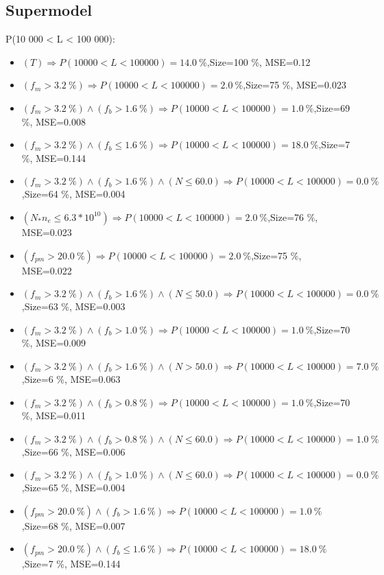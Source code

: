 \documentclass[numbered]{CSL}
\begin{document}
\subsection{Supermodel}
P(10 000 < L < 100 000):
\begin{itemize}
\item $(T) \Rightarrow P(10 000 < L < 100 000) = 14.0~\%$,\hfill Size=100 \%, MSE=0.12
\item $(f_m > 3.2~\%) \Rightarrow P(10 000 < L < 100 000) = 2.0~\%$,\hfill Size=75 \%, MSE=0.023
\item $(f_m > 3.2~\%) \land (f_b > 1.6~\%) \Rightarrow P(10 000 < L < 100 000) = 1.0~\%$,\hfill Size=69 \%, MSE=0.008
\item $(f_m > 3.2~\%) \land (f_b \leq 1.6~\%) \Rightarrow P(10 000 < L < 100 000) = 18.0~\%$,\hfill Size=7 \%, MSE=0.144
\item $(f_m > 3.2~\%) \land (f_b > 1.6~\%) \land (N \leq 60.0) \Rightarrow P(10 000 < L < 100 000) = 0.0~\%$,\hfill Size=64 \%, MSE=0.004
\item $(N_* n_e \leq 6.3 * 10^{10}) \Rightarrow P(10 000 < L < 100 000) = 2.0~\%$,\hfill Size=76 \%, MSE=0.023
\item $(f_{pm} > 20.0~\%) \Rightarrow P(10 000 < L < 100 000) = 2.0~\%$,\hfill Size=75 \%, MSE=0.022
\item $(f_m > 3.2~\%) \land (f_b > 1.6~\%) \land (N \leq 50.0) \Rightarrow P(10 000 < L < 100 000) = 0.0~\%$,\hfill Size=63 \%, MSE=0.003
\item $(f_m > 3.2~\%) \land (f_b > 1.0~\%) \Rightarrow P(10 000 < L < 100 000) = 1.0~\%$,\hfill Size=70 \%, MSE=0.009
\item $(f_m > 3.2~\%) \land (f_b > 1.6~\%) \land (N > 50.0) \Rightarrow P(10 000 < L < 100 000) = 7.0~\%$,\hfill Size=6 \%, MSE=0.063
\item $(f_m > 3.2~\%) \land (f_b > 0.8~\%) \Rightarrow P(10 000 < L < 100 000) = 1.0~\%$,\hfill Size=70 \%, MSE=0.011
\item $(f_m > 3.2~\%) \land (f_b > 0.8~\%) \land (N \leq 60.0) \Rightarrow P(10 000 < L < 100 000) = 1.0~\%$,\hfill Size=66 \%, MSE=0.006
\item $(f_m > 3.2~\%) \land (f_b > 1.0~\%) \land (N \leq 60.0) \Rightarrow P(10 000 < L < 100 000) = 0.0~\%$,\hfill Size=65 \%, MSE=0.004
\item $(f_{pm} > 20.0~\%) \land (f_b > 1.6~\%) \Rightarrow P(10 000 < L < 100 000) = 1.0~\%$,\hfill Size=68 \%, MSE=0.007
\item $(f_{pm} > 20.0~\%) \land (f_b \leq 1.6~\%) \Rightarrow P(10 000 < L < 100 000) = 18.0~\%$,\hfill Size=7 \%, MSE=0.144

\end{itemize}
\end{document}
